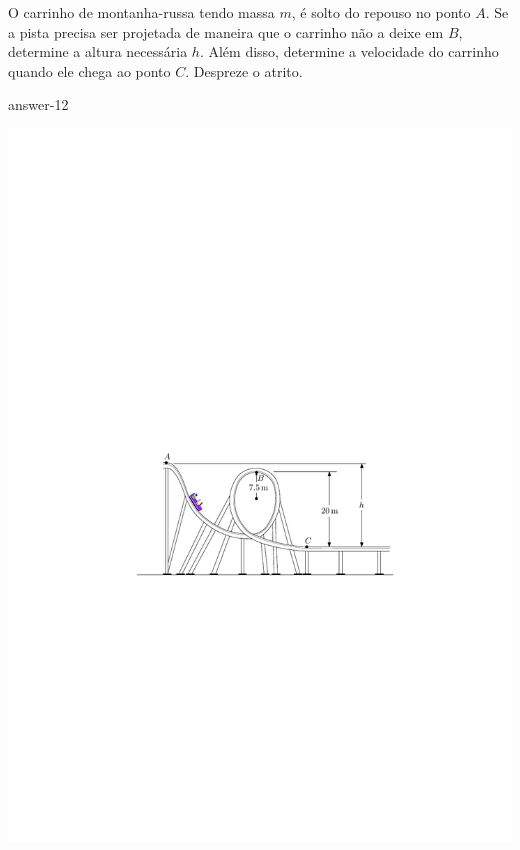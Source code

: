 
\item O carrinho de montanha-russa tendo massa $m$, é solto do repouso no ponto $A$. Se a pista precisa ser projetada de maneira que o carrinho não a deixe em $B$, determine a altura necessária $h$. Além disso, determine a velocidade do carrinho quando ele chega ao ponto $C$. Despreze o atrito.

{answer-12}

\begin{flushleft}
    \includegraphics[scale=1.3]{images/draw_12.pdf}
\end{flushleft}